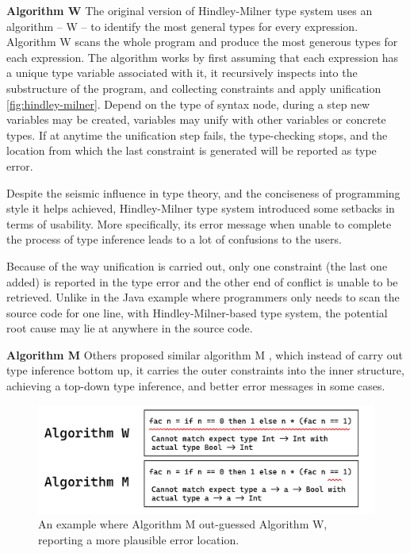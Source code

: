 \textbf{Algorithm W} The original version of Hindley-Milner type system uses an algorithm -- W -- to identify the most general types for every expression. Algorithm W scans the whole program and produce the most generous types for each expression. The algorithm works by first assuming that each expression has a unique type variable associated with it,  it recursively inspects into the substructure of the program, and collecting constraints and apply unification \ref{fig:hindley-milner}. Depend on the type of syntax node, during a step new variables may be created, variables may unify with other variables or concrete types. If at anytime the unification step fails, the type-checking stops, and the location from which the last constraint is generated will be reported as type error.


Despite the seismic influence in type theory, and the conciseness of programming style it helps achieved,  Hindley-Milner type system introduced some setbacks in terms of usability. More specifically, its error message when unable to complete the process of type inference leads to a lot of confusions to the users. 

Because of the way unification is carried out, only one constraint (the last one added) is reported in the type error and the other end of conflict is unable to be retrieved. Unlike in the Java example where programmers only needs to scan the source code for one line, with Hindley-Milner-based type system, the potential root cause may lie at anywhere in the source code.

\textbf{Algorithm M} 
Others proposed similar algorithm M \cite{Lee1998-fx}, which instead of carry out type inference bottom up, it carries the outer constraints into the inner structure, achieving a top-down type inference, and better error messages in some cases. 

\begin{figure}[hbt]
  \includegraphics[width=0.8\linewidth]{AlgorithmWM1.pdf}
  \caption{
    \label{fig:algorithm-m-1}
      An example where Algorithm M out-guessed Algorithm W, reporting a more plausible error location.}
\end{figure}


